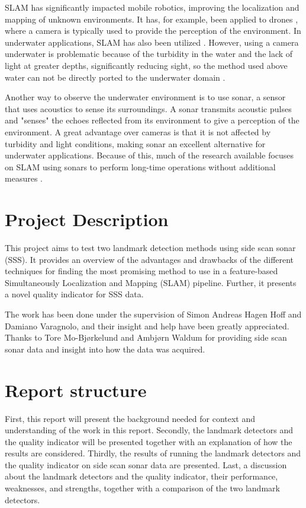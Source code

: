 SLAM has significantly impacted mobile robotics, improving the localization and mapping of unknown environments. It has, for example, been applied to drones \cite{VonStumberg2017FromExploration}, where a camera is typically used to provide the perception of the environment. In underwater applications, SLAM has also been utilized \cite{Hidalgo2015ReviewTechniques}. However, using a camera underwater is problematic because of the turbidity in the water and the lack of light at greater depths, significantly reducing sight, so the method used above water can not be directly ported to the underwater domain \cite{Paull2015Communication-constrainedSLAM}.  

Another way to observe the underwater environment is to use sonar, a sensor that uses acoustics to sense its surroundings. A sonar transmits acoustic pulses and "senses" the echoes reflected from its environment to give a perception of the environment. A great advantage over cameras is that it is not affected by turbidity and light conditions, making sonar an excellent alternative for underwater applications. Because of this, much of the research available focuses on SLAM using sonars to perform long-time operations without additional measures \cite{Hidalgo2015ReviewTechniques}.

\section{Project Description}

This project aims to test two landmark detection methods using side scan sonar (SSS). It provides an overview of the advantages and drawbacks of the different techniques for finding the most promising method to use in a feature-based Simultaneously Localization and Mapping (SLAM) pipeline. Further, it presents a novel quality indicator for SSS data.

The work has been done under the supervision of Simon Andreas Hagen Hoff and Damiano Varagnolo, and their insight and help have been greatly appreciated. Thanks to Tore Mo-Bjørkelund and Ambjørn Waldum for providing side scan sonar data and insight into how the data was acquired. 

\section{Report structure}

First, this report will present the background needed for context and understanding of the work in this report. Secondly, the landmark detectors and the quality indicator will be presented together with an explanation of how the results are considered. Thirdly, the results of running the landmark detectors and the quality indicator on side scan sonar data are presented. Last, a discussion about the landmark detectors and the quality indicator, their performance, weaknesses, and strengths, together with a comparison of the two landmark detectors.  


